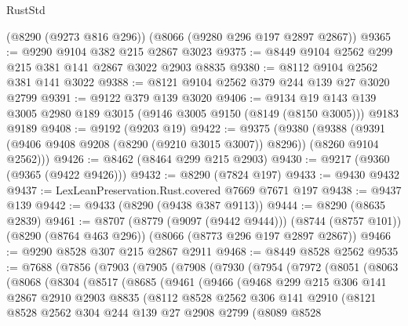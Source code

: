 \begin{lexlean}{RustStd}
\begin{coremodule}
    (@8290 (@9273 @816 @296))
    (@8066 (@9280 @296 @197 @2897 @2867))
@9365 := @9290 @9104 @382 @215 @2867 @3023
@9375 := @8449 @9104 @2562 @299 @215 @381 @141 @2867 @3022 @2903 @8835
@9380 := @8112 @9104 @2562 @381 @141 @3022
@9388 := @8121 @9104 @2562 @379 @244 @139 @27 @3020 @2799
@9391 := @9122 @379 @139 @3020
@9406 := @9134
    @19
    @143
    @139
    @3005
    @2980
    @189
    @3015
    (@9146 @3005 @9150 (@8149 (@8150 @3005)))
    @9183
    @9189
@9408 := @9192 (@9203 @19)
@9422 := @9375
    (@9380
      (@9388 (@9391 (@9406 @9408 @9208 (@8290 (@9210 @3015 @3007)) @8296)) (@8260 @9104 @2562)))
@9426 := @8462 (@8464 @299 @215 @2903)
@9430 := @9217 (@9360 (@9365 (@9422 @9426)))
@9432 := @8290 (@7824 @197)
@9433 := @9430 @9432
@9437 := LexLeanPreservation.Rust.covered @7669 @7671 @197
@9438 := @9437 @139
@9442 := @9433 (@8290 (@9438 @387 @9113))
@9444 := @8290 (@8635 @2839)
@9461 := @8707
    (@8779 (@9097 (@9442 @9444)))
    (@8744 (@8757 @101))
    (@8290 (@8764 @463 @296))
    (@8066 (@8773 @296 @197 @2897 @2867))
@9466 := @9290 @8528 @307 @215 @2867 @2911
@9468 := @8449 @8528 @2562
@9535 := @7688
    (@7856
      (@7903
        (@7905
          (@7908
            (@7930
              (@7954
                (@7972
                  (@8051
                    (@8063
                      (@8068
                        (@8304
                          (@8517
                            (@8685
                              (@9461
                                (@9466
                                  (@9468
                                    @299
                                    @215
                                    @306
                                    @141
                                    @2867
                                    @2910
                                    @2903
                                    @8835
                                    (@8112
                                      @8528
                                      @2562
                                      @306
                                      @141
                                      @2910
                                      (@8121
                                        @8528
                                        @2562
                                        @304
                                        @244
                                        @139
                                        @27
                                        @2908
                                        @2799
                                        (@8089
                                          @8528

\end{coremodule}
\end{lexlean}
